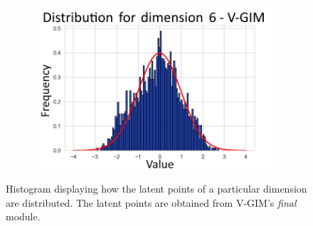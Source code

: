 \begin{figure}[h]
\begin{subfigure}[b]{0.25\textwidth}
	\end{subfigure}
	\hfill
	\begin{subfigure}[b]{0.25\textwidth}
		\centering
		\includegraphics[width=1\linewidth]{"graphs/distr/module2 kld0035/_ distribution_latent_space_GIM_dim=5"}
	\end{subfigure}
	\caption{Histogram displaying how the latent points of a particular dimension are distributed. The latent points are obtained from V-GIM's \textit{final} module.}
	\label{fig:distr_module2_beta0035}
\end{figure}
